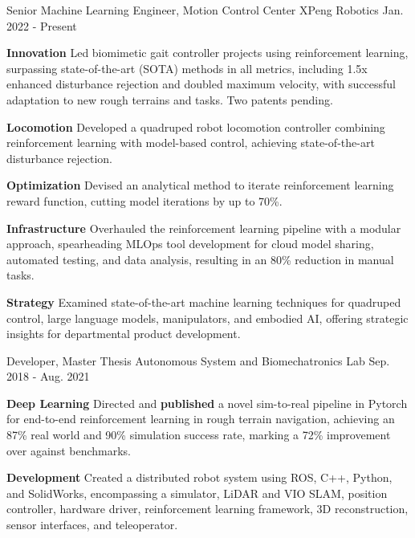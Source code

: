 \begin{cventries}
	\cventry
	{Senior Machine Learning Engineer, Motion Control Center}
	{XPeng Robotics}
	{Jan. 2022 - Present}
	{}
	{
		\begin{cvitems}
			\item {
				\textbf{Innovation} Led biomimetic gait controller projects using reinforcement learning, surpassing state-of-the-art (SOTA) methods in all metrics, including 1.5x enhanced disturbance rejection and doubled maximum velocity, with successful adaptation to new rough terrains and tasks. Two patents pending.
			}
			\item {
				\textbf{Locomotion} Developed a quadruped robot locomotion controller combining reinforcement learning with model-based control, achieving state-of-the-art disturbance rejection.
			}
			\item {
				\textbf{Optimization} Devised an analytical method to iterate reinforcement learning reward function, cutting model iterations by up to 70\%.
			}
			\item {
				\textbf{Infrastructure} Overhauled the reinforcement learning pipeline with a modular approach, spearheading MLOps tool development for cloud model sharing, automated testing, and data analysis, resulting in an 80\% reduction in manual tasks.
			}
			\item {
				\textbf{Strategy} Examined state-of-the-art machine learning techniques for quadruped control, large language models, manipulators, and embodied AI, offering strategic insights for departmental product development.
			}
		\end{cvitems}
	}
	\cventry
	{Developer, Master Thesis}
	{Autonomous System and Biomechatronics Lab}
	{Sep. 2018 - Aug. 2021}
	{}
	{
		\begin{cvitems}
			\item {
				\textbf{Deep Learning} Directed and \textbf{published} a novel sim-to-real pipeline  in Pytorch for end-to-end reinforcement learning in rough terrain navigation, achieving an 87\% real world and 90\% simulation success rate, marking a 72\% improvement over against benchmarks.
			}
			\item {
				\textbf{Development} Created a distributed robot system using ROS, C++, Python, and SolidWorks, encompassing a simulator, LiDAR and VIO SLAM, position controller, hardware driver, reinforcement learning framework, 3D reconstruction, sensor interfaces, and teleoperator.
}
\end{cvitems}}
\end{cventries}
